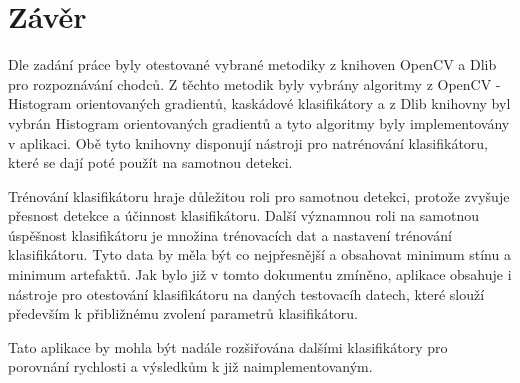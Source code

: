 \section{Závěr}
Dle zadání práce byly otestované vybrané metodiky z knihoven OpenCV a Dlib pro rozpoznávání chodců. Z těchto metodik byly vybrány algoritmy z OpenCV - Histogram orientovaných gradientů, kaskádové klasifikátory a z Dlib knihovny byl vybrán Histogram orientovaných gradientů a tyto algoritmy byly implementovány v aplikaci. Obě tyto knihovny disponují nástroji pro natrénování klasifikátoru, které se dají poté použít na samotnou detekci.

Trénování klasifikátoru hraje důležitou roli pro samotnou detekci, protože zvyšuje přesnost detekce a účinnost klasifikátoru.  Další významnou roli na samotnou úspěšnost klasifikátoru je množina trénovacích dat a nastavení trénování klasifikátoru. Tyto data by měla být co nejpřesnější a obsahovat minimum stínu a minimum artefaktů. Jak bylo již v tomto dokumentu zmíněno, aplikace obsahuje i nástroje pro otestování klasifikátoru na daných testovacíh datech, které slouží především k přibližnému zvolení parametrů klasifikátoru.

Tato aplikace by mohla být nadále rozšiřována dalšími klasifikátory pro porovnání rychlosti a výsledkům k již naimplementovaným. 